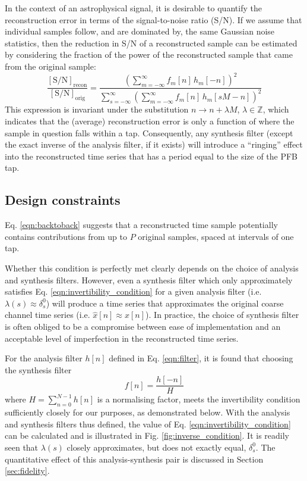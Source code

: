 \documentclass{pasa}%
\newcommand{\Kron}{\delta_s^0}
\begin{document}
In the context of an astrophysical signal, it is desirable to quantify the reconstruction error in terms of the signal-to-noise ratio (S/N).
If we assume that individual samples follow, and are dominated by, the same Gaussian noise statistics, then the reduction in S/N of a reconstructed sample can be estimated by considering the fraction of the power of the reconstructed sample that came from the original sample:
\begin{equation}
    \frac{[\text{S/N}]_\text{recon}}{[\text{S/N}]_\text{orig}}
      = \frac{\left(\sum\limits_{m = -\infty}^{\infty} f_m[n]\,h_m[-n]\right)^2}{
            \sum\limits_{s = -\infty}^{\infty}
            \left(\sum\limits_{m = -\infty}^{\infty} f_m[n]\,h_m[sM - n]\right)^2
        }
\end{equation}
This expression is invariant under the substitution $n \rightarrow n + \lambda M$, $\lambda \in \mathbb{Z}$, which indicates that the (average) reconstruction error is only a function of where the sample in question falls within a tap.
Consequently, any synthesis filter (except the exact inverse of the analysis filter, if it exists) will introduce a ``ringing'' effect into the reconstructed time series that has a period equal to the size of the PFB tap.

\subsection{Design constraints}

Eq. \eqref{eqn:backtoback} suggests that a reconstructed time sample potentially contains contributions from up to $P$ original samples, spaced at intervals of one tap.



Whether this condition is perfectly met clearly depends on the choice of analysis and synthesis filters.
However, even a synthesis filter which only approximately satisfies Eq. \eqref{eqn:invertibility_condition} for a given analysis filter (i.e. $\lambda(s) \approx \Kron$) will produce a time series that approximates the original coarse channel time series (i.e. $\hat{x}[n] \approx x[n]$).
In practice, the choice of synthesis filter is often obliged to be a compromise between ease of implementation and an acceptable level of imperfection in the reconstructed time series.

For the analysis filter $h[n]$ defined in Eq. \eqref{eqn:filter}, it is found that choosing the synthesis filter
\begin{equation}
    f[n] = \frac{h[-n]}{H}
    \label{eqn:synthesisfilter}
\end{equation}
where $H = \sum_{n=0}^{N-1} h[n]$ is a normalising factor, meets the invertibility condition sufficiently closely for our purposes, as demonstrated below.
With the analysis and synthesis filters thus defined, the value of Eq. \eqref{eqn:invertibility_condition} can be calculated and is illustrated in Fig. \ref{fig:inverse_condition}.
It is readily seen that $\lambda(s)$ closely approximates, but does not exactly equal, $\Kron$.
The quantitative effect of this analysis-synthesis pair is discussed in Section \ref{sec:fidelity}.
\end{document}
